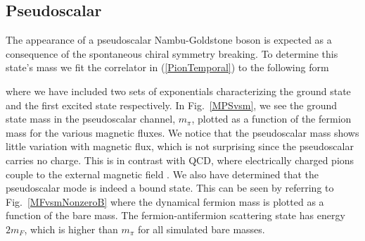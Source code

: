 \documentclass[aps,prd,twocolumn,showpacs,superscriptaddress,groupedaddress]{revtex4}  %
\begin{document}
\subsection{\label{sec:PS}Pseudoscalar}
The appearance of a pseudoscalar Nambu-Goldstone boson is expected as a consequence of the spontaneous chiral symmetry breaking. To determine this state's mass we fit the correlator in (\ref{PionTemporal}) to the following form
\begin{widetext}[
\beq
\label{PS2Point} 
G^{(\tau)}_{PS}(\tau; \vec{p} = {\bf 0}) = A\left( e^{-m_{\pi}\tau} + e^{-m_{\pi}(N_{\tau} - \tau)} \right) + A'\left( e^{-m'_{\pi}\tau} + e^{-m'_{\pi}(N_{\tau} - \tau)} \right),
\eeq
]\end{widetext}
where we have included two sets of exponentials characterizing the ground state and the first excited state respectively.
In Fig.~\ref{MPSvsm}, we see the ground state mass in the pseudoscalar channel, $m_{\pi}$, plotted as a function of the fermion mass for the various magnetic fluxes.  
We notice that the pseudoscalar mass shows little variation with magnetic flux, which is not surprising since the pseudoscalar carries no charge. This is in contrast with QCD, where electrically charged  pions couple to the 
external magnetic field \cite{SmilgaShushpanov}. We also have determined that the pseudoscalar mode is indeed a bound state. This can be seen by referring to Fig.~\ref{MFvsmNonzeroB} where the dynamical fermion mass is plotted as a function of the bare mass. The fermion-antifermion scattering state has energy $2m_F$, which is higher than $m_{\pi}$ for all simulated bare masses.



\end{document}
